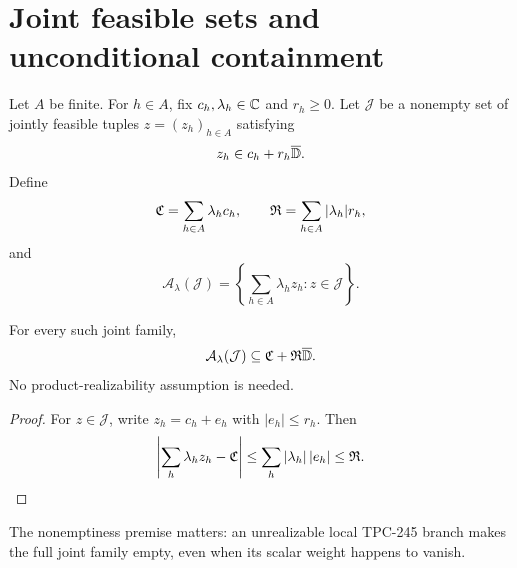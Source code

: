 \section{Joint feasible sets and unconditional containment}

Let $A$ be finite.  For $h\in A$, fix $c_h,\lambda_h\in\mathbb{C}$ and $r_h\ge0$.
Let $\mathcal J$ be a nonempty set of jointly feasible tuples
$z=(z_h)_{h\in A}$ satisfying
\[
 z_h\in c_h+r_h\overline{\mathbb{D}}.
\]
Define
\[
 \mathfrak{C}=\sum_{h\in A}\lambda_hc_h,
 \qquad
 \mathfrak{R}=\sum_{h\in A}|\lambda_h|r_h,
\]
and
\[
 \mathcal A_\lambda(\mathcal J)
 =\left\{\sum_{h\in A}\lambda_hz_h:z\in\mathcal J\right\}.
\]

\begin{proposition}\label{prop:containment}
For every such joint family,
\[
 \mathcal A_\lambda(\mathcal J)
 \subseteq \mathfrak{C}+\mathfrak{R}\overline{\mathbb{D}}.
\]
No product-realizability assumption is needed.
\end{proposition}

\begin{proof}
For $z\in\mathcal J$, write $z_h=c_h+e_h$ with $|e_h|\le r_h$.
Then
\[
 \left|\sum_h\lambda_hz_h-\mathfrak{C}\right|
 \le \sum_h|\lambda_h|\,|e_h|
 \le \mathfrak{R}.
\]
\end{proof}

The nonemptiness premise matters: an unrealizable local TPC-245 branch makes
the full joint family empty, even when its scalar weight happens to vanish.
